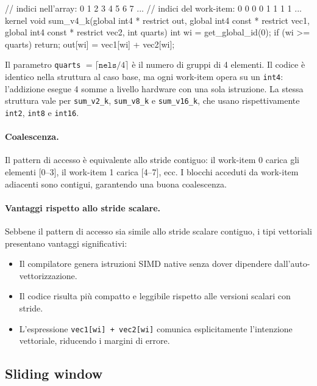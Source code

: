 \begin{code}[caption={Kernel di somma con tipo vettoriale \texttt{int4}}, label={code:sum_v4_k}]
// indici nell'array:    0 1 2 3 4 5 6 7 ...
// indici del work-item: 0 0 0 0 1 1 1 1 ...
kernel void sum_v4_k(global int4 * restrict out,
    global int4 const * restrict vec1,
    global int4 const * restrict vec2,
    int quarts)
{
    int wi = get_global_id(0);
    if (wi >= quarts) return;
    out[wi] = vec1[wi] + vec2[wi];
}
\end{code}

Il parametro \texttt{quarts} $= \lceil\texttt{nels}/4\rceil$ è il numero di gruppi di 4 elementi. Il codice è identico nella struttura al caso base, ma ogni work-item opera su un \texttt{int4}: l'addizione esegue 4 somme a livello hardware con una sola istruzione. La stessa struttura vale per \texttt{sum\_v2\_k}, \texttt{sum\_v8\_k} e \texttt{sum\_v16\_k}, che usano rispettivamente \texttt{int2}, \texttt{int8} e \texttt{int16}.

\paragraph{Coalescenza.}
Il pattern di accesso è equivalente allo stride contiguo: il work-item 0 carica gli elementi [0--3], il work-item 1 carica [4--7], ecc. I blocchi acceduti da work-item adiacenti sono contigui, garantendo una buona coalescenza.

\paragraph{Vantaggi rispetto allo stride scalare.}
Sebbene il pattern di accesso sia simile allo stride scalare contiguo, i tipi vettoriali presentano vantaggi significativi:
\begin{itemize}
    \item Il compilatore genera istruzioni SIMD native senza dover dipendere dall'auto-vettorizzazione.
    \item Il codice risulta più compatto e leggibile rispetto alle versioni scalari con stride.
    \item L'espressione \texttt{vec1[wi] + vec2[wi]} comunica esplicitamente l'intenzione vettoriale, riducendo i margini di errore.
\end{itemize}

\subsection{Sliding window}

